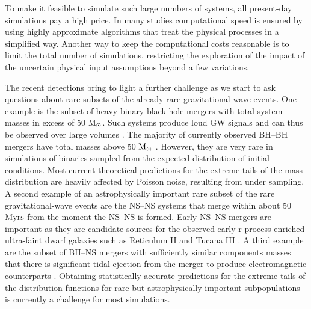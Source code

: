 \documentclass[a4paper,fleqn,usenatbib,useAMS,usedcolumn]{mnras}
\begin{document}
To make it feasible to simulate such large numbers of systems, all present-day simulations pay a high price.  In many studies computational speed is ensured by using highly approximate algorithms that treat the physical processes in a simplified way. 
Another way to keep the computational costs reasonable is to limit the total number of simulations, restricting the exploration of the impact of the uncertain physical input assumptions beyond a few variations. 

The recent detections bring to light a further challenge as we start to ask questions about rare subsets of the already rare gravitational-wave events.  One example is the subset of heavy binary black hole mergers with total system masses in excess of 50 $\rm M_{\odot}$.  Such systems produce loud GW signals and can thus be observed over large volumes \citep[][]{2017ApJ...851L..25F}. The majority of currently observed BH--BH mergers have total masses above 50 $\rm M_{\odot}$  \citep[][]{2018arXiv181112907T}. 
However, they are very rare in simulations of binaries sampled from the expected distribution of initial conditions.  Most current theoretical predictions for the extreme tails of the mass distribution are heavily affected by Poisson noise, resulting from under sampling.    A second example of an astrophysically important rare subset of the rare gravitational-wave events are the NS--NS systems that merge within about 50 $\rm Myrs$ from the moment the NS--NS is formed. 
Early NS--NS mergers are important as they are candidate sources for the observed early r-process enriched ultra-faint dwarf galaxies such as Reticulum II and Tucana III \citep[e.g.][]{2019ApJ...872..105S}.
 A third example  are the  subset of BH--NS mergers with sufficiently similar components masses that there is significant tidal ejection from the merger to  produce electromagnetic counterparts \citep{2018arXiv180700011F}.
Obtaining statistically accurate predictions for the extreme tails of the distribution functions for rare but astrophysically important subpopulations is currently a challenge for most simulations.   
\end{document}
